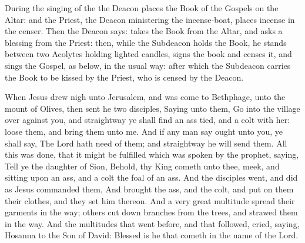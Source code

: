 
\begin{rubric}
    During the singing of the  the Deacon places the Book of the Gospels on the Altar: and the Priest, the Deacon ministering the incense-boat, places incense in the censer. Then the Deacon says:  takes the Book from the Altar, and asks a blessing from the Priest: then, while the Subdeacon holds the Book, he stands between two Acolytes holding lighted candles, signs the book and censes it, and sings the Gospel, as below, in the usual way: after which the Subdeacon carries the Book to be kissed by the Priest, who is censed by the Deacon.
\end{rubric}

 When Jesus drew nigh unto Jerusalem, and was come to Bethphage, unto the mount of Olives, then sent he two disciples, Saying unto them, Go into the village over against you, and straightway ye shall find an ass tied, and a colt with her: loose them, and bring them unto me. And if any man say ought unto you, ye shall say, The Lord hath need of them; and straightway he will send them. All this was done, that it might be fulfilled which was spoken by the prophet, saying, Tell ye the daughter of Sion, Behold, thy King cometh unto thee, meek, and sitting upon an ass, and a colt the foal of an ass. And the disciples went, and did as Jesus commanded them, And brought the ass, and the colt, and put on them their clothes, and they set him thereon. And a very great multitude spread their garments in the way; others cut down branches from the trees, and strawed them in the way. And the multitudes that went before, and that followed, cried, saying, Hosanna to the Son of David: Blessed is he that cometh in the name of the Lord.

